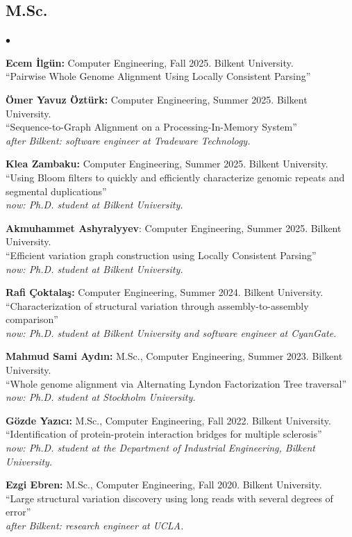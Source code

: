 \documentclass[margin,line]{res}
\newenvironment{list2}{
  \begin{list}{$\bullet$}{%
      \setlength{\itemsep}{0.1cm}
      \setlength{\parsep}{0in} \setlength{\parskip}{0in}
      \setlength{\topsep}{0in} \setlength{\partopsep}{0in} 
      \setlength{\leftmargin}{0.2in}}}{\end{list}}
\begin{document}
\begin{resume}
\subsection{\small \sc M.Sc.}
\begin{list2}
 \item
  {\bf Ecem İlgün:} Computer Engineering, Fall 2025. Bilkent University.\\
  ``Pairwise Whole Genome Alignment Using Locally Consistent Parsing''
\item
  {\bf Ömer Yavuz Öztürk:} Computer Engineering, Summer 2025.
  Bilkent University. \\
  ``Sequence-to-Graph Alignment on a Processing-In-Memory System''\\
   {\it after Bilkent: software engineer at Tradeware Technology.}  
  \item
    {\bf Klea Zambaku:} Computer Engineering, Summer 2025.
    Bilkent University. \\
    ``Using Bloom filters to quickly and efficiently characterize genomic repeats and segmental duplications''\\
    {\it now: Ph.D. student at Bilkent University.}  
  \item 
    \textbf{Akmuhammet Ashyralyyev}: Computer Engineering, Summer 2025. 
    Bilkent University. \\
    ``Efficient variation graph construction using Locally Consistent Parsing''\\
   {\it now: Ph.D. student at Bilkent University.}  
  \item
  {\bf Rafi Çoktalaş:} Computer Engineering, Summer 2024.
  Bilkent University.\\
  ``Characterization of structural variation through assembly-to-assembly comparison''\\
  {\it now: Ph.D. student at Bilkent University and software engineer at CyanGate.}
\item
  {\bf Mahmud Sami Aydın:} M.Sc., Computer Engineering, Summer 2023.
  Bilkent University. \\
  ``Whole genome alignment via Alternating Lyndon Factorization Tree traversal''\\
   {\it now: Ph.D. student at Stockholm University.}
  \item
  {\bf Gözde Yazıcı:} M.Sc., Computer Engineering, Fall 2022.
  Bilkent University. \\
  ``Identification of protein-protein interaction bridges for multiple sclerosis''\\
   {\it now: Ph.D. student at the Department of Industrial Engineering, Bilkent University.}
\item
  {\bf Ezgi Ebren:} M.Sc., Computer Engineering, Fall 2020. Bilkent University. \\
  ``Large structural variation discovery using long reads with several degrees of error''\\
  {\it after Bilkent: research engineer at UCLA.}



\end{list2}
\end{resume}
\end{document}
